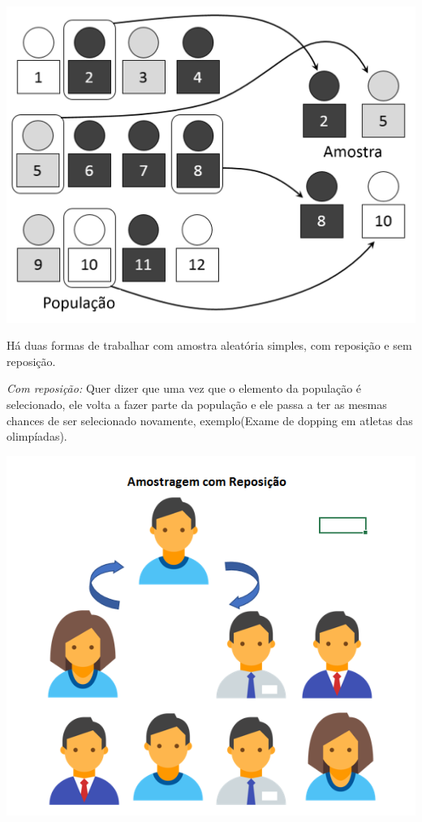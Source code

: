 \documentclass[12pt,a4paper]{article}
\begin{document}
{\centering \includegraphics[scale=0.17]{Amostragem/AleatoriaSimples.png} \par}

Há duas formas de trabalhar com amostra aleatória simples, com reposição e sem reposição. 

\textit{Com reposição:}
Quer dizer que uma vez que o elemento da população é selecionado, ele volta a fazer parte da população 
e ele passa a ter as mesmas chances de ser selecionado novamente, exemplo(Exame de dopping em atletas das olimpíadas). 

{\centering \includegraphics[scale=0.45]{Amostragem/amostragemComReposicao.png} \par}
\end{document}
